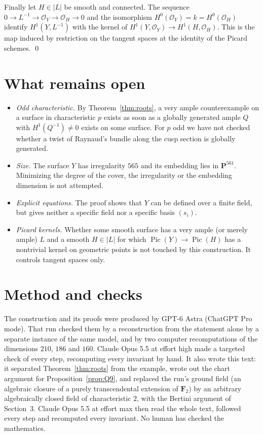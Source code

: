 \documentclass[11pt,a4paper]{article}
\theoremstyle{plain}
\theoremstyle{remark}
\newcommand{\OO}{\mathcal O}
\newcommand{\F}{\mathbf F}
\newcommand{\PP}{\mathbf P}
\newcommand{\Pic}{\operatorname{Pic}}
\begin{document}
Finally let $H\in|L|$ be smooth and connected. The sequence $0\to L^{-1}\to\OO_Y\to\OO_H\to0$ and the isomorphism
$H^0(\OO_Y)=k=H^0(\OO_H)$ identify $H^1(Y,L^{-1})$ with the kernel of $H^1(Y,\OO_Y)\to H^1(H,\OO_H)$. This is the map
induced by restriction on the tangent spaces at the identity of the Picard schemes. \qed

\section{What remains open}

\begin{itemize}
\item \emph{Odd characteristic.} By Theorem~\ref{thm:roots}, a very ample counterexample on a surface in characteristic
$p$ exists as soon as a globally generated ample $Q$ with $H^1(Q^{-1})\ne0$ exists on some surface. For $p$ odd we have
not checked whether a twist of Raynaud's bundle along the cusp section is globally generated.
\item \emph{Size.} The surface $Y$ has irregularity $565$ and its embedding lies in $\PP^{561}$. Minimizing the degree
of the cover, the irregularity or the embedding dimension is not attempted.
\item \emph{Explicit equations.} The proof shows that $Y$ can be defined over a finite field, but gives neither a
specific field nor a specific basis $(s_i)$.
\item \emph{Picard kernels.} Whether some smooth surface has a very ample (or merely ample) $L$ and a smooth
$H\in|L|$ for which $\Pic(Y)\to\Pic(H)$ has a nontrivial kernel on geometric points is not touched by this
construction. It controls tangent spaces only.
\end{itemize}

\section*{Method and checks}

The construction and its proofs were produced by GPT-6 Astra (ChatGPT Pro mode). That run checked them by a
reconstruction from the statement alone by a separate instance of the same model, and by two computer recomputations
of the dimensions $210$, $186$ and $160$. Claude Opus 5.5 at effort high made a targeted check of every step, recomputing
every invariant by hand. It also wrote this text: it separated Theorem~\ref{thm:roots} from the example, wrote out the
chart argument for Proposition~\ref{prop:Q9}, and replaced the run's ground field (an algebraic closure of a purely
transcendental extension of $\F_2$) by an arbitrary algebraically closed field of characteristic $2$, with the Bertini
argument of Section~3. Claude Opus 5.5 at effort max then read the whole text, followed every step and
recomputed every invariant. No human has checked the mathematics.
\end{document}
